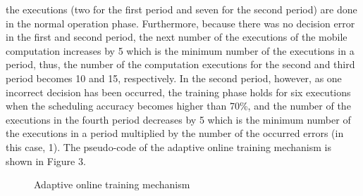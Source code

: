 \documentclass[10pt, conference, compsocconf]{IEEEtran}
\begin{document}
{the executions (two for the first period and seven for the second
period) are done in the normal operation phase. 
Furthermore, because there was no decision error in the first and second
period, the next number of the executions of the mobile computation
increases by 5 which is the minimum number of the executions in a
period, thus, the number of the computation executions for the second
and third period becomes 10 and 15, respectively.
%
In the second period, however, as one incorrect decision has been
occurred, the training phase holds for six executions when the
scheduling accuracy becomes higher than 70\%, and the number of the
executions in the fourth period decreases by 5 which is the minimum
number of the executions in a period multiplied by the number of the
occurred errors (in this case, 1). 
%
The pseudo-code of the adaptive online training mechanism is shown in
Figure 3.
%
\begin{figure}
\begin{algorithmic}[1]
	\ELSE
		\ELSE
		\ENDIF
	\ENDIF
\ENDWHILE
\STATE
{}
\ELSE
\ENDIF
\end{algorithmic}
\caption{Adaptive online training mechanism}
\end{figure}
%
}
\end{document}

